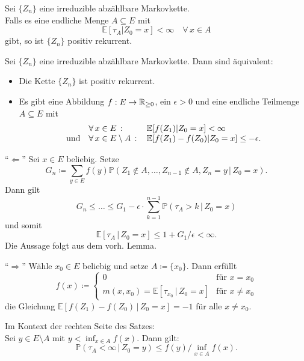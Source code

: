 \documentclass{cheat-sheet}
\renewcommand{\P}{\mathbb{P}} %
\newcommand{\E}{\mathbb{E}} %
\begin{document}

\begin{lem}
  Sei $\{ Z_n \}$ eine irreduzible abzählbare Markovkette. \\
  Falls es eine endliche Menge $A \subseteq E$ mit
  \[
    \E[ \tau_A | Z_0 = x ] < \infty
    \quad \forall\, x \in A
  \]
  gibt, so ist $\{ Z_n \}$ positiv rekurrent.
\end{lem}

\begin{satz}
  Sei $\{ Z_n \}$ eine irreduzible abzählbare Markovkette.
  Dann sind äquivalent:
  \begin{itemize}
    \item Die Kette $\{ Z_n \}$ ist positiv rekurrent.
    \item Es gibt eine Abbildung $f : E \to \mathbb{R}_{\geq 0}$, ein $\epsilon > 0$ und eine endliche Teilmenge $A \subseteq E$ mit
    \[
      \begin{array}{r l l}
        & \fa{x \in E} & \E[ f(Z_1) | Z_0 = x ] < \infty \\
        \text{und} & \fa{x \in E \setminus A} & \E[ f(Z_1) - f(Z_0) | Z_0 = x ] \leq - \epsilon.
      \end{array}
    \]
  \end{itemize}
\end{satz}

\begin{beweisskizze}
  "`$\Leftarrow$"'
  Sei $x \in E$ beliebig.
  Setze
  \[
    G_n \coloneqq \sum_{y \in E} f(y) \P(Z_1 \not\in A, \ldots, Z_{n-1} \not\in A, Z_n = y \,|\, Z_0 = x).
  \]
  Dann gilt
  \[
    G_n \leq \ldots \leq G_1 - \epsilon \cdot {\sum}_{k=1}^{n-1} \P(\tau_A > k \,|\, Z_0 = x)
  \]
  und somit
  \[
    \E[ \tau_A \,|\, Z_0 = x ] \leq 1 + G_1 / \epsilon < \infty.
  \]
  Die Aussage folgt aus dem vorh. Lemma.

  "`$\Rightarrow$"'
  Wähle $x_0 \in E$ beliebig und setze $A \coloneqq \{ x_0 \}$.
  Dann erfüllt
  \[
    f(x) \coloneqq \begin{cases}
      0 & \text{für } x = x_0 \\
      m(x, x_0) = \E[ \tau_{x_0} \,|\, Z_0 = x ] & \text{für } x \neq x_0
    \end{cases}
  \]
  die Gleichung $\E[f(Z_1) - f(Z_0) \,|\, Z_0 = x] = -1$ für alle $x \neq x_0$.
\end{beweisskizze}

\begin{lem}
  \begin{minipage}[t]{0.8 \linewidth}
    Im Kontext der rechten Seite des Satzes: \\
    Sei $y \in E \setminus A$ mit $y < {\inf}_{x \in A} f(x)$.
    Dann gilt:
    \[
      \P(\tau_A < \infty \,|\, Z_0 = y) \leq f(y) / {\inf}_{x \in A} f(x).
    \]
  \end{minipage}
\end{lem}
\end{document}
